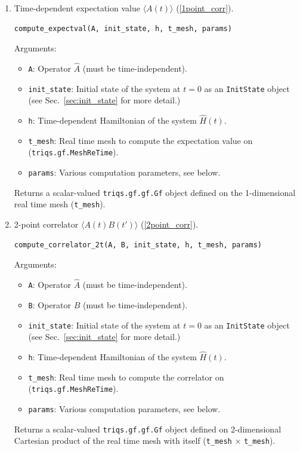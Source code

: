 \documentclass[]{article}
\newcommand{\aver}[1]{\ensuremath{\langle#1\rangle}}
\begin{document}
\begin{enumerate}

    \item Time-dependent expectation value $\aver{A(t)}$ (\ref{1point_corr}).
    \begin{lstlisting}[language=Python]
    compute_expectval(A, init_state, h, t_mesh, params)
    \end{lstlisting}
    Arguments:
    \begin{itemize}
        \item \texttt{A}: Operator $\hat{A}$ (must be time-independent).
        \item \texttt{init\_state}: Initial state of the system at $t=0$ as an \texttt{InitState} object (see Sec.~\ref{sec:init_state} for more detail.)
        \item \texttt{h}: Time-dependent Hamiltonian of the system $\hat H(t)$.
        \item \texttt{t\_mesh}: Real time mesh to compute the expectation value on (\texttt{triqs.gf.MeshReTime}).
        \item \texttt{params}: Various computation parameters, see below.
    \end{itemize}
    Returns a scalar-valued \texttt{triqs.gf.gf.Gf} object defined on the 1-dimensional real time mesh (\texttt{t\_mesh}).

    \item 2-point correlator $\aver{A(t) B(t')}$ (\ref{2point_corr}).
    \begin{lstlisting}[language=Python]
        compute_correlator_2t(A, B, init_state, h, t_mesh, params)
    \end{lstlisting}
    Arguments:
    \begin{itemize}
        \item \texttt{A}: Operator $\hat{A}$ (must be time-independent).
        \item \texttt{B}: Operator $\hat{B}$ (must be time-independent).
        \item \texttt{init\_state}: Initial state of the system at $t=0$ as an \texttt{InitState} object (see Sec.~\ref{sec:init_state} for more detail.)
        \item \texttt{h}: Time-dependent Hamiltonian of the system $\hat H(t)$.
        \item \texttt{t\_mesh}: Real time mesh to compute the correlator on (\texttt{triqs.gf.MeshReTime}).
        \item \texttt{params}: Various computation parameters, see below.
    \end{itemize}
    Returns a scalar-valued \texttt{triqs.gf.gf.Gf} object defined on 2-dimensional Cartesian product of the real time mesh with itself (\texttt{t\_mesh} $\times$ \texttt{t\_mesh}).


\end{enumerate}
\end{document}
